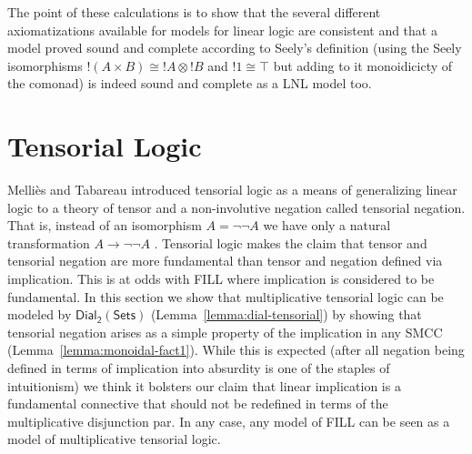\documentclass{elsarticle}
\newcommand{\dial}[0]{\mathsf{Dial_2}(\mathsf{Sets})}
\begin{document}

The point of these calculations is to show that the several different
axiomatizations available for models for linear logic are consistent
and that a model proved sound and complete according to Seely's
definition (using the Seely isomorphisms $!(A \times B)\cong !A\otimes
!B$ and $!1\cong \top$ but adding to it monoidicicty of the comonad)
is indeed sound and complete as a LNL model too.

\section{Tensorial Logic}
\label{sec:tensor_logic}

Melli\`es and Tabareau introduced tensorial logic as a means of
generalizing linear logic to a theory of tensor and a non-involutive
negation called tensorial negation.  That is, instead of an
isomorphism $A = \lnot\lnot A$ we have only a natural transformation
$A \to \lnot\lnot A$ \cite{Mellies:2008}.  Tensorial logic makes the
claim that tensor and tensorial negation are more fundamental than
tensor and negation defined via implication.  This is at odds with
FILL where implication is considered to be fundamental.  In this
section we show that multiplicative tensorial logic can be modeled by
$\dial$ (Lemma~\ref{lemma:dial-tensorial}) by showing that tensorial
negation arises as a simple property of the implication in any SMCC
(Lemma~\ref{lemma:monoidal-fact1}).  While this is expected (after all
negation being defined in terms of implication into absurdity is one
of the staples of intuitionism) we think it bolsters our claim that
linear implication is a fundamental connective that should not be
redefined in terms of the multiplicative disjunction par.  In any
case, any model of FILL can be seen as a model of multiplicative
tensorial logic.  
\end{document}
